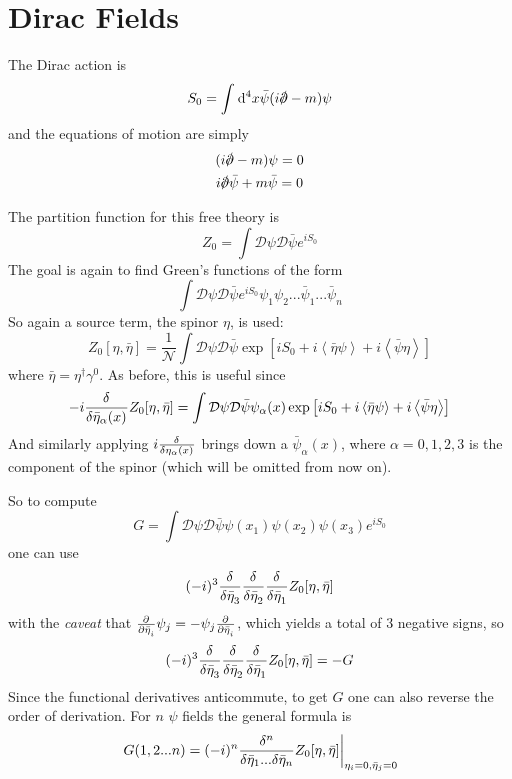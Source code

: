 \section{Dirac Fields}
The Dirac action is
\[
    S_0 = \int_{}^{} \dd^4x\bar\psi(i\slashed{\pd}-m)\psi 
\]
and the equations of motion are simply
\begin{gather*}
    (i\slashed{\pd}-m)\psi =0\\
    i\slashed{\pd}\bar\psi +m\bar\psi =0
\end{gather*}

The partition function for this free theory is
\[
    Z_0=\int \mathcal{D}\psi\mathcal{D}\bar\psi  e^{iS_0}
\]
The goal is again to find Green's functions of the form
\[
    \int \mathcal{D}\psi\mathcal{D}\bar\psi e^{iS_0}\psi_1\psi_2...\bar\psi_1...
    \bar\psi_n
\]
So again a source term, the spinor $\eta$, is used:
\[
    Z_0[\eta,\bar\eta]=\frac{1}{\mathcal{N}}\int\mathcal{D}\psi\mathcal{D}\bar\psi
    \exp\left[ iS_0 + i \left\langle \bar\eta \psi\right\rangle +i\left\langle 
    \bar\psi \eta\right\rangle  \right]
\]
where $\bar\eta =\eta^\dagger\gamma^0$. As before, this is useful since
\[
    -i\fdv[]{}{\bar\eta_\alpha(x)}Z_0[\eta,\bar\eta] =
    \int \mathcal{D}\psi \mathcal{D}\bar\psi \psi_\alpha(x)\exp\left[ iS_0+i
    \left\langle \bar\eta \psi \right\rangle +i\left\langle\bar\psi\eta
\right\rangle \right]
\]
And similarly applying $i\fdv[]{}{\eta_\alpha(x) }$ brings down a
$\bar\psi_\alpha(x)$, where $\alpha=0,1,2,3$ is the component of the spinor (which
will be omitted from now on).

So to compute
\[
    G=\int \mathcal{D}\psi\mathcal{D}\bar\psi \psi(x_1)\psi(x_2)\psi(x_3)e^{iS_0}
\]
one can use
\[
    (-i)^3\fdv[]{}{\bar\eta_3}\fdv[]{}{\bar\eta_2}\fdv[]{}{\bar\eta_1}
    Z_0[\eta,\bar\eta]
\]
with the \textit{caveat} that
$\pdv[]{}{\bar\eta_i}\psi_j = -\psi_j\pdv[]{}{\bar\eta_i}$, which yields a total
of $3$ negative signs, so
\[
    (-i)^3\fdv[]{}{\bar\eta_3}\fdv[]{}{\bar\eta_2}\fdv[]{}{\bar\eta_1}
    Z_0[\eta,\bar\eta]=-G
\]
Since the functional derivatives anticommute, to get $G$ one can also reverse the
order of derivation. For $n$ $\psi$ fields the general formula is
\[
    \eval{G(1,2...n) = (-i)^n \frac{\delta^n}{\delta\bar\eta_1...
    \delta\bar\eta_n}Z_0[\eta,\bar\eta]}_{\eta_i=0,\bar\eta_j=0}
\]

